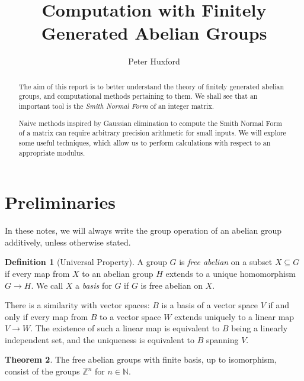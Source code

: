 \documentclass[12pt,a4paper]{article}
\title{Computation with Finitely Generated Abelian Groups}
\author{Peter Huxford}
\newcommand{\N}{\mathbb{N}}
\newcommand{\Z}{\mathbb{Z}}
\theoremstyle{definition}
\newtheorem{theorem}{Theorem}[section]
\newtheorem{definition}[theorem]{Definition}
\begin{document}
\maketitle

\begin{abstract}
  The aim of this report is to better understand the theory of finitely generated abelian groups, and computational methods pertaining to them. We shall see that an important tool is the \emph{Smith Normal Form} of an integer matrix.

Naive methods inspired by Gaussian elimination to compute the Smith Normal Form of a matrix can require arbitrary precision arithmetic for small inputs. We will explore some useful techniques, which allow us to perform calculations with respect to an appropriate modulus.
\end{abstract}

\section{Preliminaries}

In these notes, we will always write the group operation of an abelian group additively, unless otherwise stated. 

\begin{definition}[Universal Property]
  A group $G$ is \emph{free abelian} on a subset $X\subseteq G$ if every map from $X$ to an abelian group $H$ extends to a unique homomorphism $G\to H$. We call $X$ a \emph{basis} for $G$ if $G$ is free abelian on $X$.
\end{definition}

There is a similarity with vector spaces: $B$ is a basis of a vector space $V$ if and only if every map from $B$ to a vector space $W$ extends uniquely to a linear map $V\to W$. The existence of such a linear map is equivalent to $B$ being a linearly independent set, and the uniqueness is equivalent to $B$ spanning $V$.


\begin{theorem}
  The free abelian groups with finite basis, up to isomorphism, consist of the groups $\Z^n$ for $n\in\N$.
\end{theorem}
\end{document}
